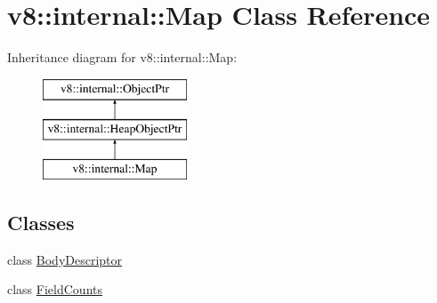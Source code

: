\hypertarget{classv8_1_1internal_1_1Map}{}\section{v8\+:\+:internal\+:\+:Map Class Reference}
\label{classv8_1_1internal_1_1Map}
Inheritance diagram for v8\+:\+:internal\+:\+:Map\+:\begin{figure}[H]
\begin{center}
\leavevmode
\includegraphics[height=3.000000cm]{classv8_1_1internal_1_1Map}
\end{center}
\end{figure}
\subsection*{Classes}
\begin{DoxyCompactItemize}
\item 
class \mbox{\hyperlink{classv8_1_1internal_1_1Map_1_1BodyDescriptor}{Body\+Descriptor}}
\item 
class \mbox{\hyperlink{classv8_1_1internal_1_1Map_1_1FieldCounts}{Field\+Counts}}
\end{DoxyCompactItemize}
